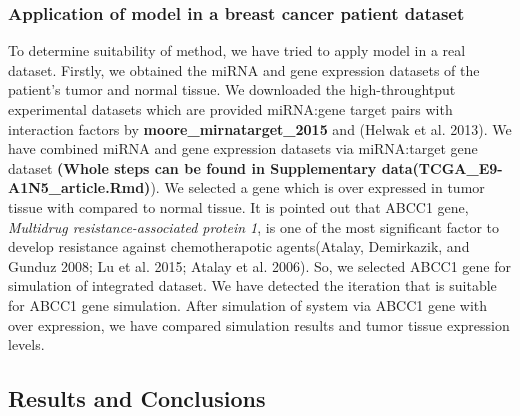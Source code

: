 \documentclass[]{article}
\begin{document}
\hypertarget{application-of-model-in-a-breast-cancer-patient-dataset}{%
\subsubsection{Application of model in a breast cancer patient
dataset}\label{application-of-model-in-a-breast-cancer-patient-dataset}}

To determine suitability of method, we have tried to apply model in a
real dataset. Firstly, we obtained the miRNA and gene expression
datasets of the patient's tumor and normal tissue. We downloaded the
high-throughtput experimental datasets which are provided miRNA:gene
target pairs with interaction factors by
\textbf{moore\_mirnatarget\_2015} and (Helwak et al. 2013). We have
combined miRNA and gene expression datasets via miRNA:target gene
dataset \textbf{(Whole steps can be found in Supplementary
data(TCGA\_E9-A1N5\_article.Rmd)}). We selected a gene which is over
expressed in tumor tissue with compared to normal tissue. It is pointed
out that ABCC1 gene, \emph{Multidrug resistance-associated protein 1},
is one of the most significant factor to develop resistance against
chemotherapotic agents(Atalay, Demirkazik, and Gunduz 2008; Lu et al.
2015; Atalay et al. 2006). So, we selected ABCC1 gene for simulation of
integrated dataset. We have detected the iteration that is suitable for
ABCC1 gene simulation. After simulation of system via ABCC1 gene with
over expression, we have compared simulation results and tumor tissue
expression levels.

\hypertarget{results-and-conclusions}{%
\subsection{Results and Conclusions}\label{results-and-conclusions}}
\end{document}
